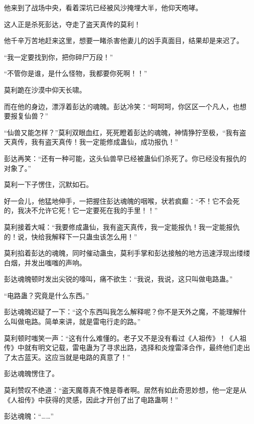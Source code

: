 \begin{this_body}
他来到了战场中央，看着深坑已经被风沙掩埋大半，他仰天咆哮。

这人正是杀死彭达，夺走了盗天真传的莫利！

他千辛万苦地赶来这里，想要一睹杀害他妻儿的凶手真面目，结果却是来迟了。

“我一定要找到你，把你碎尸万段！”

“不管你是谁，是什么怪物，我都要你死啊！！”

莫利跪在沙漠中仰天长啸。

而在他的身边，漂浮着彭达的魂魄。彭达冷笑：“呵呵呵，你区区一个凡人，也想要报复仙兽？”

“仙兽又能怎样？”莫利双眼血红，死死瞪着彭达的魂魄，神情狰狞至极，“我有盗天真传，我有盗天真传！我一定能修成蛊仙，成功报仇！”

彭达再笑：“还有一种可能，这头仙兽早已经被蛊仙们杀死了。你已经没有报仇的对象了。”

莫利一下子愣住，沉默如石。

好一会儿，他猛地伸手，一把握住彭达魂魄的咽喉，状若疯癫：“不！它不会死的，我决不允许它死！它一定要死在我的手里！！”

莫利接着大喊：“我要修成蛊仙，我有盗天真传，我一定能报仇！我一定能报仇的！说，快给我解释下一只蛊虫该怎么用！”

莫利掐着彭达的魂魄，同时催动蛊虫，莫利手掌和彭达接触的地方迅速浮现出缕缕白烟，并发出嗤嗤的声响。

彭达魂魄顿时发出尖锐的嚎叫，痛不欲生：“我说，我说，这只叫做电路蛊。”

“电路蛊？究竟是什么东西。”

彭达魂魄迟疑了一下：“这个东西叫我怎么解释呢？你不是天外之魔，不能理解什么叫做电路。简单来讲，就是雷电行走的路。”

莫利顿时嗤笑一声：“这有什么难懂的。老子又不是没有看过《人祖传》！《人祖传》中就有明文记载，雷电蛊为了寻求出路，选择和炎煌雷泽合作，最终他们走出了太古蓝天。这应当就是电路的真意了！”

彭达魂魄愣住了。

莫利赞叹不绝道：“盗天魔尊真不愧是尊者啊。居然有如此奇思妙想，他一定是从《人祖传》中获得的灵感，因此才开创了出了电路蛊啊！”

彭达魂魄：“……”

\end{this_body}

